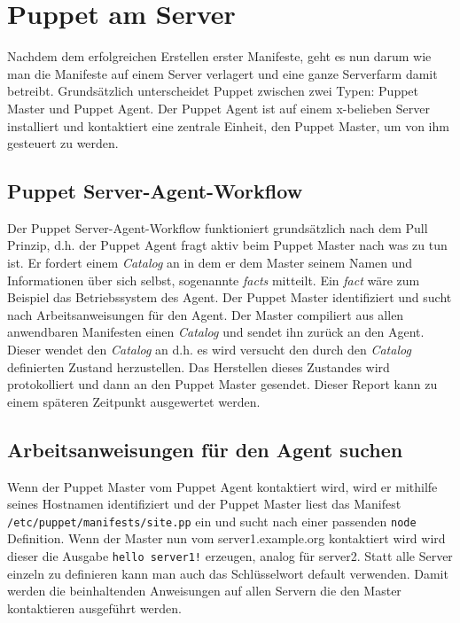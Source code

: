 \documentclass[12pt,a4paper,ngerman]{article}
\begin{document}
\section{Puppet am Server}

Nachdem dem erfolgreichen Erstellen erster Manifeste, geht es nun darum wie man die Manifeste auf einem Server verlagert und eine ganze Serverfarm damit betreibt. Grundsätzlich unterscheidet Puppet zwischen zwei Typen: Puppet Master und Puppet Agent. Der Puppet Agent ist auf einem x-belieben Server installiert und kontaktiert eine zentrale Einheit, den Puppet Master, um von ihm gesteuert zu werden. 

\subsection{Puppet Server-Agent-Workflow}

Der Puppet Server-Agent-Workflow funktioniert grundsätzlich nach dem Pull Prinzip, d.h. der Puppet Agent fragt aktiv beim Puppet Master nach was zu tun ist. Er fordert einem \textit{Catalog} an in dem er dem Master seinem Namen und Informationen über sich selbst, sogenannte \textit{facts} mitteilt. Ein \textit{fact} wäre zum Beispiel das Betriebssystem des Agent. Der Puppet Master identifiziert und sucht nach Arbeitsanweisungen für den Agent. Der Master compiliert aus allen anwendbaren Manifesten einen \textit{Catalog} und sendet ihn zurück an den Agent. Dieser wendet den \textit{Catalog} an d.h. es wird versucht den durch den \textit{Catalog} definierten Zustand herzustellen. Das Herstellen dieses Zustandes wird protokolliert und dann an den Puppet Master gesendet. Dieser Report kann zu einem späteren Zeitpunkt ausgewertet werden.


\subsection{Arbeitsanweisungen für den Agent suchen}

Wenn der Puppet Master vom Puppet Agent kontaktiert wird, wird er mithilfe seines Hostnamen identifiziert und der Puppet Master liest das Manifest \lstinline$/etc/puppet/manifests/site.pp$ ein und sucht nach einer passenden \lstinline$node$ Definition. Wenn der Master nun vom server1.example.org kontaktiert wird wird dieser die Ausgabe \lstinline$hello server1!$ erzeugen, analog für server2. Statt alle Server einzeln zu definieren kann man auch das Schlüsselwort default verwenden. Damit werden die beinhaltenden Anweisungen auf allen Servern die den Master kontaktieren ausgeführt werden. 
\end{document}
